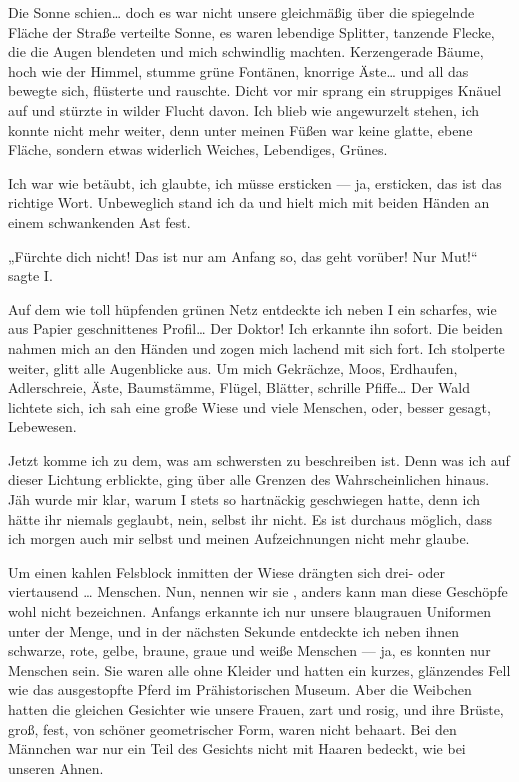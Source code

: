 Die Sonne schien\ldots{} doch es war nicht unsere gleichmäßig über die
spiegelnde Fläche der Straße verteilte Sonne, es waren lebendige
Splitter, tanzende Flecke, die die Augen blendeten und mich
schwindlig machten. Kerzengerade Bäume, hoch wie der Himmel, stumme
grüne Fontänen, knorrige Äste\ldots{} und all das bewegte sich,
flüsterte und rauschte. Dicht vor mir sprang ein struppiges Knäuel
auf und stürzte in wilder Flucht davon. Ich blieb wie angewurzelt
stehen, ich konnte nicht mehr weiter, denn unter meinen Füßen war
keine glatte, ebene Fläche, sondern etwas widerlich Weiches,
Lebendiges, Grünes.

Ich war wie betäubt, ich glaubte, ich müsse
ersticken — ja, ersticken, das ist das richtige Wort. Unbeweglich
stand ich da und hielt mich mit beiden Händen an einem schwankenden
Ast fest.

„Fürchte dich nicht! Das ist nur am Anfang so, das geht vorüber!
Nur Mut!“ sagte I.

Auf dem wie toll hüpfenden grünen Netz entdeckte
ich
neben I ein scharfes, wie aus Papier geschnittenes Profil\ldots{} Der
Doktor! Ich erkannte ihn sofort. Die beiden nahmen mich an den
Händen und zogen mich lachend mit sich fort. Ich stolperte weiter,
glitt alle Augenblicke aus. Um mich Gekrächze, Moos, Erdhaufen,
Adlerschreie, Äste, Baumstämme, Flügel, Blätter, schrille Pfiffe\ldots{}
Der Wald lichtete sich, ich sah eine große Wiese und viele
Menschen, oder, besser gesagt, Lebewesen.

Jetzt komme ich zu dem, was am schwersten zu beschreiben ist. Denn
was ich auf dieser Lichtung erblickte, ging über alle Grenzen des
Wahrscheinlichen hinaus. Jäh wurde mir klar, warum I stets so
hartnäckig geschwiegen hatte, denn ich hätte ihr niemals geglaubt,
nein, selbst ihr nicht. Es ist durchaus möglich, dass ich morgen
auch mir selbst und meinen Aufzeichnungen nicht mehr glaube.

Um
einen kahlen Felsblock inmitten der Wiese drängten sich drei- oder
viertausend \ldots{} Menschen. Nun, nennen wir sie , anders kann
man diese Geschöpfe wohl nicht bezeichnen. Anfangs erkannte ich nur
unsere blaugrauen Uniformen unter der Menge, und in der nächsten
Sekunde entdeckte ich neben ihnen schwarze, rote, gelbe, braune,
graue und weiße Menschen — ja, es konnten nur Menschen sein. Sie
waren alle ohne Kleider und hatten ein kurzes, glänzendes Fell wie
das ausgestopfte Pferd im Prähistorischen Museum. Aber die Weibchen
hatten die gleichen Gesichter wie unsere Frauen, zart und rosig,
und ihre Brüste, groß, fest, von schöner geometrischer Form, waren
nicht behaart. Bei den Männchen war nur ein Teil des Gesichts nicht
mit Haaren bedeckt, wie bei unseren Ahnen.

